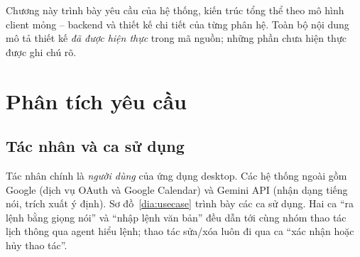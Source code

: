 \label{ch:design}

Chương này trình bày yêu cầu của hệ thống, kiến trúc tổng thể theo mô hình client mỏng – backend và thiết kế chi tiết của từng phân hệ. Toàn bộ nội dung mô tả thiết kế \textit{đã được hiện thực} trong mã nguồn; những phần chưa hiện thực được ghi chú rõ.

\section{Phân tích yêu cầu}
\subsection{Tác nhân và ca sử dụng}
Tác nhân chính là \textit{người dùng} của ứng dụng desktop. Các hệ thống ngoài gồm Google (dịch vụ OAuth và Google Calendar) và Gemini API (nhận dạng tiếng nói, trích xuất ý định). Sơ đồ~\ref{dia:usecase} trình bày các ca sử dụng. Hai ca “ra lệnh bằng giọng nói” và “nhập lệnh văn bản” đều dẫn tới cùng nhóm thao tác lịch thông qua agent hiểu lệnh; thao tác sửa/xóa luôn đi qua ca “xác nhận hoặc hủy thao tác”.

